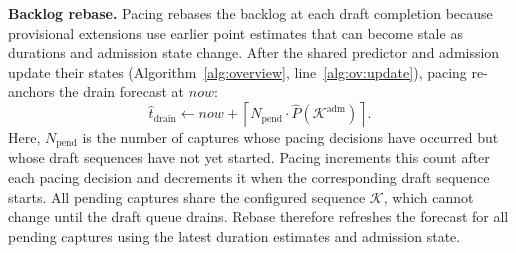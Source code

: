 \smallskip\noindent\textbf{Backlog rebase.}
Pacing rebases the backlog at each draft completion because provisional extensions use earlier point estimates that can become stale as durations and admission state change.
After the shared predictor and admission update their states (Algorithm~\ref{alg:overview}, line~\ref{alg:ov:update}), pacing re-anchors the drain forecast at \(\mathit{now}\):
\begin{equation}
  \hat t_{\mathrm{drain}}
  \gets
  \mathit{now}
  +\left\lceil
    N_{\mathrm{pend}}\cdot\hat P(\mathcal K^{\mathrm{adm}})
  \right\rceil.
  \label{eq:clock-rebase}
\end{equation}
Here, \(N_{\mathrm{pend}}\) is the number of captures whose pacing decisions have occurred but whose draft sequences have not yet started.
Pacing increments this count after each pacing decision and decrements it when the corresponding draft sequence starts.
All pending captures share the configured sequence \(\mathcal K\), which cannot change until the draft queue drains.
Rebase therefore refreshes the forecast for all pending captures using the latest duration estimates and admission state.
